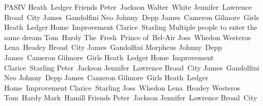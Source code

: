\answerkey
{} PASIV
 Heath Ledger
 Friends
 Peter Jackson
 Walter White
 Jennifer Lawrence
 Broad City
 James Gandolfini
 Neo
 Johnny Depp
 James Cameron
 Gilmore Girls
 Heath Ledger
 Home Improvement
 Clarice Starling
 Multiple people to enter the same dream
 Tom Hardy
 The Fresh Prince of Bel‑Air
 Joss Whedon
 Westeros
 Lena Headey
 Broad City
 James Gandolfini
 Morpheus
 Johnny Depp
 James Cameron
 Gilmore Girls
 Heath Ledger
 Home Improvement
 Clarice Starling
 Peter Jackson
 Jennifer Lawrence
 Broad City
 James Gandolfini
 Neo
 Johnny Depp
 James Cameron
 Gilmore Girls
 Heath Ledger
 Home Improvement
 Clarice Starling
 Joss Whedon
 Lena Headey
 Westeros
 Tom Hardy
 Mark Hamill
 Friends
 Peter Jackson
 Jennifer Lawrence
 Broad City
\endanswerkey